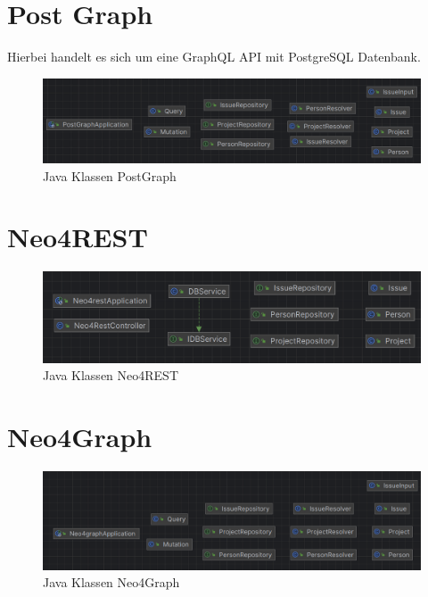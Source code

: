 
\section{Post Graph} %
\label{sec:postgraph}
Hierbei handelt es sich um eine GraphQL API mit PostgreSQL Datenbank. 
\begin{figure}[H]
	\centering
	\includegraphics[scale=0.5]{Illustrations/postgraph.png}
	\caption{Java Klassen PostGraph}
\end{figure}

\section{Neo4REST} %
\label{sec:neo4rest}
\begin{figure}[H]
	\centering
	\includegraphics[scale=0.5]{Illustrations/neo4rest.png}
	\caption{Java Klassen Neo4REST}
\end{figure}

\section{Neo4Graph} %
\label{sec:neo4graph}
\begin{figure}[H]
	\centering
	\includegraphics[scale=0.5]{Illustrations/neo4graph.png}
	\caption{Java Klassen Neo4Graph}
\end{figure}


